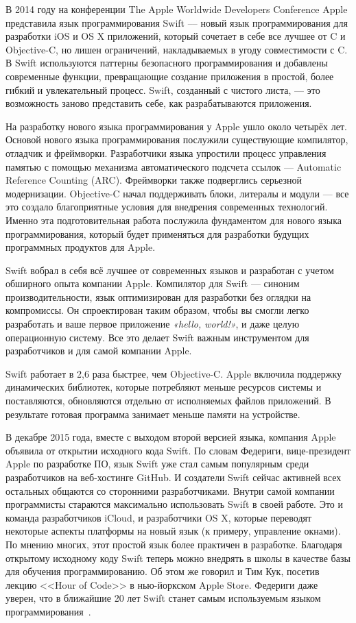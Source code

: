 
В 2014 году на конференции The Apple Worldwide Developers Conference Apple
представила язык программирования Swift --– новый язык программирования
для разработки iOS и OS X приложений, который сочетает в себе все лучшее от C и Objective-C,
но лишен ограничений, накладываемых в угоду совместимости с C.
В Swift используются паттерны безопасного программирования и добавлены
современные функции, превращающие создание приложения в простой,
более гибкий и увлекательный процесс. Swift, созданный с чистого листа, ---
это возможность заново представить себе, как разрабатываются приложения.

На разработку нового языка программирования у Apple ушло около четырёх лет.
Основой нового языка программирования послужили существующие компилятор,
отладчик и фреймворки. Разработчики языка упростили процесс управления памятью
с помощью механизма автоматического подсчета ссылок --- Automatic Reference Counting (ARC).
Фреймворки также подверглись серьезной модернизации. Objective-C начал
поддерживать блоки, литералы и модули --- все это создало благоприятные условия
для внедрения современных технологий. Именно эта подготовительная работа
послужила фундаментом для нового языка программирования,
который будет применяться для разработки будущих программных продуктов для Apple.

Swift вобрал в себя всё лучшее от современных языков и разработан с учетом
обширного опыта компании Apple. Компилятор для Swift --- синоним производительности,
язык оптимизирован для разработки без оглядки на компромиссы.
Он спроектирован таким образом, чтобы вы смогли легко разработать
и ваше первое приложение \textit{«hello, world!»}, и даже целую операционную систему.
Все это делает Swift важным инструментом для разработчиков и для самой компании Apple.

Swift работает в 2,6 раза быстрее, чем Objective-C. Apple включила поддержку
динамических библиотек, которые потребляют меньше ресурсов системы и поставляются,
обновляются отдельно от исполняемых файлов приложений.
В результате готовая программа занимает меньше памяти на устройстве.

В декабре 2015 года, вместе с выходом второй версией языка, компания Apple
объявила от открытии исходного кода Swift.
По словам Федериги, вице-президент Apple по разработке ПО, язык Swift уже
стал самым популярным среди разработчиков на веб-хостинге GitHub.
И создатели Swift сейчас активней всех остальных общаются со сторонними разработчиками.
Внутри самой компании программисты стараются максимально использовать Swift
в своей работе. Это и команда разработчиков iCloud, и разработчики OS X,
которые переводят некоторые аспекты платформы на новый язык (к примеру,
управление окнами). По мнению многих, этот простой язык более практичен в разработке.
Благодаря открытому исходному коду Swift теперь можно внедрять
в школы в качестве базы для обучения программированию. Об этом же говорил
и Тим Кук, посетив лекцию <<Hour of Code>> в нью-йоркском Apple Store.
Федериги даже уверен, что в ближайшие 20 лет Swift станет самым
используемым языком программирования~\cite{federighi_about_swift, habr_swift}.

